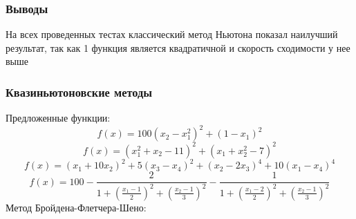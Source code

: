 \documentclass[a4paper, 14pt]{article}
\begin{document}
\subsubsection*{Выводы}
На всех проведенных тестах классический метод Ньютона показал наилучший результат, так как 1 функция является квадратичной и скорость сходимости у нее выше

\subsubsection*{Квазиньютоновские методы}
Предложенные функции:
\[
f(x) = 100(x_2 - x_1^2)^2 + (1 - x_1)^2\]
\[
f(x) = (x_1^2 + x_2 - 11)^2 + (x_1 + x_2^2 - 7) ^ 2\]
\[
f(x) = (x_1 + 10x_2)^2 + 5(x_3 - x_4)^2 + (x_2 - 2x_3)^4 + 10(x_1 - x_4)^4\]
\[
f(x) = 100 -\frac{2}{1 + (\frac{x_1 - 1}{2})^2 + (\frac{x_2 - 1}{3})^2} -\frac{1}{1 + (\frac{x_1 - 2}{2})^2 + (\frac{x_2 - 1}{3})^2} \]
Метод Бройдена-Флетчера-Шено:\\
\end{document}
